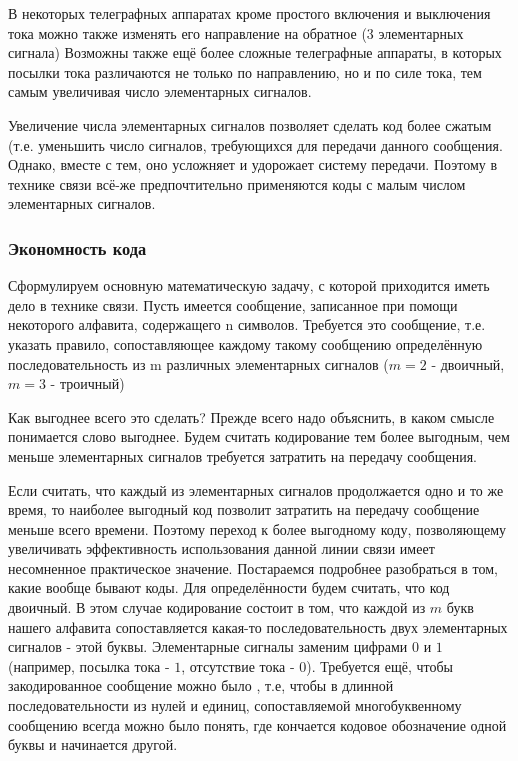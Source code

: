 ﻿\documentclass[a4paper,12pt]{report}
\begin{document}
	В некоторых телеграфных аппаратах кроме простого включения и выключения тока можно также изменять его направление на обратное (3 элементарных сигнала) Возможны также ещё более сложные телеграфные аппараты, в которых посылки тока различаются не только по направлению, но и по силе тока, тем самым увеличивая число элементарных сигналов.
	
	Увеличение числа элементарных сигналов позволяет сделать код более сжатым (т.е. уменьшить число сигналов, требующихся для передачи данного сообщения. Однако, вместе с тем, оно усложняет и удорожает систему передачи. Поэтому в технике связи всё-же предпочтительно применяются коды с малым числом элементарных сигналов.
		

	\subsubsection{Экономность кода}
	
	Сформулируем основную математическую задачу, с которой приходится иметь дело в технике связи. Пусть имеется сообщение, записанное при помощи некоторого алфавита, содержащего n символов. Требуется  это сообщение, т.е. указать правило, сопоставляющее каждому такому сообщению определённую последовательность из m различных элементарных сигналов ($m=2$ - двоичный, $m=3$ - троичный)
	
	Как выгоднее всего это сделать?  Прежде всего надо объяснить, в каком смысле понимается слово выгоднее. Будем считать кодирование тем более выгодным, чем меньше элементарных сигналов требуется затратить на передачу сообщения. 
	
	Если считать, что каждый из элементарных сигналов продолжается одно и то же время, то наиболее выгодный код позволит затратить на передачу сообщение меньше всего времени. Поэтому переход к более выгодному коду, позволяющему увеличивать эффективность использования данной линии связи имеет несомненное практическое значение. Постараемся подробнее разобраться в том, какие вообще бывают коды. Для определённости будем считать, что код двоичный. В этом случае кодирование состоит в том, что каждой из $m$ букв нашего алфавита сопоставляется какая-то последовательность двух элементарных сигналов -  этой буквы. Элементарные сигналы заменим цифрами $0$ и $1$ (например, посылка тока - $1$, отсутствие тока - $0$). Требуется ещё, чтобы закодированное сообщение можно было , т.е, чтобы в длинной последовательности из нулей и единиц, сопоставляемой многобуквенному сообщению всегда можно было понять, где кончается кодовое обозначение одной буквы и начинается другой.
	
\end{document}
